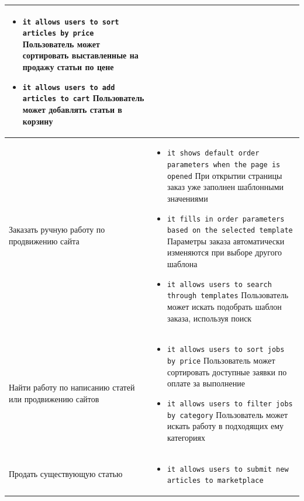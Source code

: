 \documentclass[listings]{labreport}
\begin{document}
\begin{longtable}{L{4.5cm} L{12cm}}
\begin{itemize}[noitemsep,topsep=0em,leftmargin=*]
 \item {\small\verb|it allows users to sort articles by price|}\newline
   Пользователь может сортировать выставленные на продажу статьи по цене
 \item {\small\verb|it allows users to add articles to cart|}\newline
   Пользователь может добавлять статьи в корзину
\end{itemize}
  \\\hline
Заказать ручную работу по продвижению сайта
   &
\begin{itemize}[noitemsep,topsep=0em,leftmargin=*]
 \item {\small\verb|it shows default order parameters when the page is opened|}\newline
   При открытии страницы заказ уже заполнен шаблонными значениями
 \item {\small\verb|it fills in order parameters based on the selected template|}\newline
   Параметры заказа автоматически изменяются при выборе другого шаблона
 \item {\small\verb|it allows users to search through templates|}\newline
   Пользователь может искать подобрать шаблон заказа, используя поиск
\end{itemize}
  \\\hline
Найти работу по написанию статей или продвижению сайтов
   &
\begin{itemize}[noitemsep,topsep=0em,leftmargin=*]
 \item {\small\verb|it allows users to sort jobs by price|}\newline
   Пользователь может сортировать доступные заявки по оплате за выполнение
 \item {\small\verb|it allows users to filter jobs by category|}\newline
   Пользователь может искать работу в подходящих ему категориях
\end{itemize}
  \\\hline
Продать существующую статью
   &
\begin{itemize}[noitemsep,topsep=0em,leftmargin=*]
 \item {\small\verb|it allows users to submit new articles to marketplace|}\newline

\end{itemize}
\end{longtable}
\end{document}
